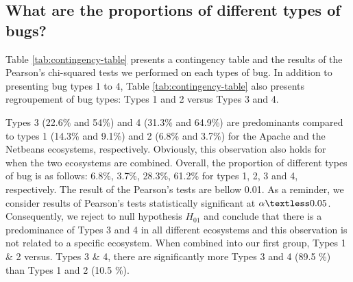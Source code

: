 
\subsection{What are the proportions of different types of bugs?}



Table \ref{tab:contingency-table} presents a contingency table and the results of the Pearson's chi-squared tests we performed on each types of bug.
In addition to presenting bug types 1 to 4,  Table \ref{tab:contingency-table} also presents regroupement of bug types:
Types 1 and 2 versus Types 3 and 4.

Types 3 (22.6\% and 54\%) and 4 (31.3\% and 64.9\%) are predominants compared to types 1 (14.3\% and 9.1\%) and 2 (6.8\% and 3.7\%) for the Apache and the Netbeans ecosystems, respectively.
Obviously, this observation also holds for when the two ecosystems are combined.
Overall, the proportion of different types of bug is as follows: 6.8\%, 3.7\%, 28.3\%, 61.2\% for types 1, 2, 3 and 4, respectively.
The result of the Pearson's tests are bellow 0.01.
As a reminder, we consider results of Pearson's tests statistically significant at $\alpha \textless0.05$.
Consequently, we reject to null hypothesis $H_{01}$ and conclude that there is a predominance of Types 3 and 4 in all different ecosystems and this observation is not related to a specific ecosystem.
When combined into our first group, Types 1 \& 2 versus. Types 3 \& 4, there are significantly more Types 3 and 4 (89.5 \%) than Types 1 and 2 (10.5 \%).
